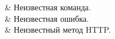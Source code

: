 {	          & \code{[w3c]} Неизвестная команда.                \\ \hline
	            & \code{[w3c]} Неизвестная ошибка.                 \\ \hline
	           & \code{[w3c]} Неизвестный метод HTTP.             \\
}

